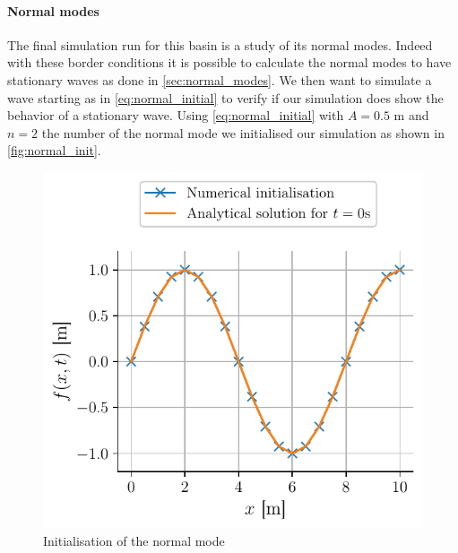 \paragraph{Normal modes} The final simulation run for this basin is a study of its normal modes. Indeed with these border conditions it is possible to calculate the normal modes to have stationary waves as done in \autoref{sec:normal_modes}. We then want to simulate a wave starting as in \autoref{eq:normal_initial} to verify if our simulation does show the behavior of a stationary wave. Using \autoref{eq:normal_initial} with $A = 0.5$ \si{\meter} and $n = 2$ the number of the normal mode we initialised our simulation as shown in \autoref{fig:normal_init}.
\begin{figure}[h]
    \centering
    \includegraphics*[width=0.6\linewidth]{figures/bassin_mode_start.pdf}
    \caption{Initialisation of the normal mode}
    \label{fig:normal_init}
\end{figure}


